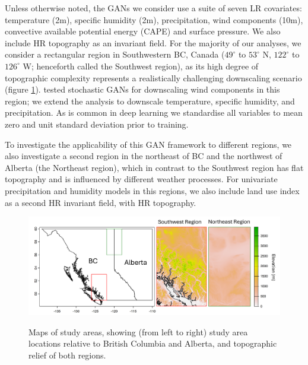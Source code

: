 \documentclass{ametsocV6.1}
\begin{document}
Unless otherwise noted, the GANs we consider use a suite of seven LR covariates: temperature (2m), specific humidity (2m), precipitation, wind components (10m), convective available potential energy (CAPE) and surface pressure. We also include HR topography as an invariant field. For the majority of our analyses, we consider a rectangular region in Southwestern BC, Canada ($49^\circ$ to $53^\circ$ N, $122^\circ$ to $126^\circ$ W; henceforth called the Southwest region), as its high degree of topographic complexity represents a realistically challenging downscaling scenario (figure \ref{studyarea}). \citet{daust2024capturing} tested stochastic GANs for downscaling wind components in this region; we extend the analysis to downscale temperature, specific humidity, and precipitation. As is common in deep learning we standardise all variables to mean zero and unit standard deviation prior to training. 

To investigate the applicability of this GAN framework to different regions, we also investigate a second region in the northeast of BC and the northwest of Alberta (the Northeast region), which in contrast to the Southwest region has flat topography and is influenced by different weather processes. For univariate precipitation and humidity models in this regions, we also include land use index as a second HR invariant field, with HR topography.

\begin{figure}[H]
  \noindent\includegraphics[width=\textwidth,angle=0]{final/Regions_Fig.png}\\
  \caption{Maps of study areas, showing (from left to right) study area locations relative to British Columbia and Alberta, and topographic relief of both regions.}\label{studyarea}
\end{figure}
\end{document}

